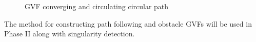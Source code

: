 \documentclass[numbered,pdftex]{ohio-etd}
\begin{document}
\begin{figure}[H]
	\begin{subfigmatrix}{2}%
		\centering	
		\hspace*{0mm}
	\end{subfigmatrix}
	\caption{GVF converging and circulating circular path}
	\label{fig:noCircSingularityDetection}
\end{figure}

The method for constructing path following and obstacle GVFs will be used in Phase II along with singularity detection.




%
%
\end{document}
